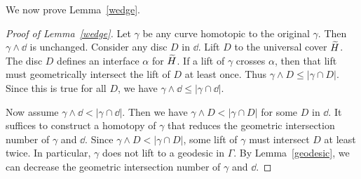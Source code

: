 We now prove Lemma~\ref{wedge}.

\begin{proof}[Proof of Lemma~\ref{wedge}]
Let $\gamma$ be any curve homotopic to the original $\gamma$.  Then $\gamma\wedge \dd$ is unchanged.  Consider any disc $D$ in $\dd$.  Lift $D$ to the universal cover $\widetilde{H}$.  The disc $D$ defines an interface $\alpha$ for $\widetilde{H}$.  If a lift of $\gamma$ crosses $\alpha$, then that lift must geometrically intersect the lift of $D$ at least once.  Thus $\gamma\wedge D \leq |\gamma\cap D|$.  Since this is true for all $D$, we have $\gamma\wedge\dd\leq|\gamma\cap \dd|$.

Now assume $\gamma\wedge \dd<|\gamma\cap\dd|$.  Then we have $\gamma\wedge D<|\gamma\cap D|$ for some $D$ in $\dd$.  It suffices to construct a homotopy of $\gamma$ that reduces the geometric intersection number of $\gamma$ and $\dd$.  Since $\gamma \wedge D<|\gamma\cap D|$, some lift of $\gamma$ must intersect $D$ at least twice.  In particular, $\gamma$ does not lift to a geodesic in $\Gamma$.  By Lemma~\ref{geodesic}, we can decrease the geometric intersection number of $\gamma$ and $\dd$.
\end{proof}
